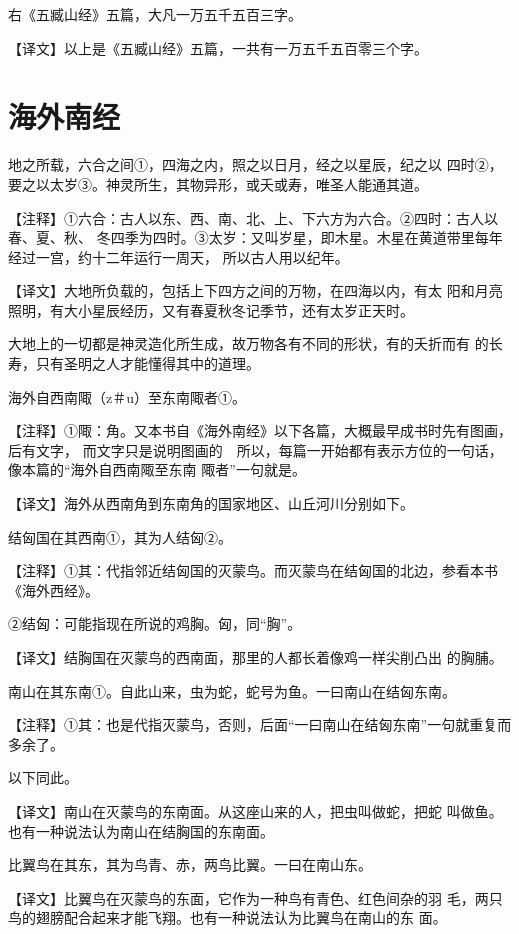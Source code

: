 \documentclass[a4paper,12pt,UTF8,twoside]{ctexbook}
\begin{document}
右《五臧山经》五篇，大凡一万五千五百三字。

【译文】以上是《五臧山经》五篇，一共有一万五千五百零三个字。


\chapter{海外南经}

地之所载，六合之间①，四海之内，照之以日月，经之以星辰，纪之以 四时②，要之以太岁③。神灵所生，其物异形，或夭或寿，唯圣人能通其道。

【注释】①六合：古人以东、西、南、北、上、下六方为六合。②四时：古人以春、夏、秋、 冬四季为四时。③太岁：又叫岁星，即木星。木星在黄道带里每年经过一宫，约十二年运行一周天， 所以古人用以纪年。

【译文】大地所负载的，包括上下四方之间的万物，在四海以内，有太 阳和月亮照明，有大小星辰经历，又有春夏秋冬记季节，还有太岁正天时。

大地上的一切都是神灵造化所生成，故万物各有不同的形状，有的夭折而有 的长寿，只有圣明之人才能懂得其中的道理。

海外自西南陬（z＃u）至东南陬者①。

【注释】①陬：角。又本书自《海外南经》以下各篇，大概最早成书时先有图画，后有文字， 而文字只是说明图画的　所以，每篇一开始都有表示方位的一句话，像本篇的“海外自西南陬至东南 陬者”一句就是。

【译文】海外从西南角到东南角的国家地区、山丘河川分别如下。

结匈国在其西南①，其为人结匈②。

【注释】①其：代指邻近结匈国的灭蒙鸟。而灭蒙鸟在结匈国的北边，参看本书《海外西经》。

②结匈：可能指现在所说的鸡胸。匈，同“胸”。

【译文】结胸国在灭蒙鸟的西南面，那里的人都长着像鸡一样尖削凸出 的胸脯。

南山在其东南①。自此山来，虫为蛇，蛇号为鱼。一曰南山在结匈东南。

【注释】①其：也是代指灭蒙鸟，否则，后面“一曰南山在结匈东南”一句就重复而多余了。

以下同此。

【译文】南山在灭蒙鸟的东南面。从这座山来的人，把虫叫做蛇，把蛇 叫做鱼。也有一种说法认为南山在结胸国的东南面。

比翼鸟在其东，其为鸟青、赤，两鸟比翼。一曰在南山东。

【译文】比翼鸟在灭蒙鸟的东面，它作为一种鸟有青色、红色间杂的羽 毛，两只鸟的翅膀配合起来才能飞翔。也有一种说法认为比翼鸟在南山的东 面。
\end{document}
